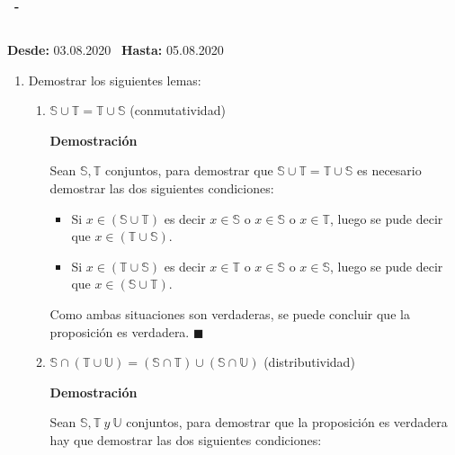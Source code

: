\documentclass[a4paper,dvipsnames]{book}
\newcommand{\np}{\null\newpage}
\newenvironment{tarea}[3]
    {
        \null\newpage
        \begin{tcolorbox}
            \textbf{\asignatura\ -\ \autor}
            \subsection{\capitalisewords{#1}}

            \begin{flushright}
            \textbf{Desde:}  #2 \
            \textbf{Hasta:}  #3 \
            \end{flushright}
        \end{tcolorbox}

    \begin{enumerate}[{Ejercicio} 1.]
    }
    {
        \end{enumerate}
        \np
    }
\begin{document}
    \begin{tarea}{Tarea Demostración de Lemas}{03.08.2020}{05.08.2020}
        \item Demostrar los siguientes lemas:

            \begin{enumerate}

                \item $\mathbb S\cup \mathbb T= \mathbb T\cup \mathbb S$
                    (conmutatividad)

                    \textbf{Demostración}

                    Sean $\mathbb S,\mathbb T$ conjuntos, para demostrar que
                    $\mathbb S\cup \mathbb T= \mathbb T\cup \mathbb S$ es
                    necesario demostrar las dos siguientes condiciones:

                    \begin{itemize}
                        \item Si $x\in(\mathbb S\cup \mathbb T)$ es decir $x\in
                            \mathbb S$ o $x\in \mathbb S$ o $x\in \mathbb T$,
                            luego se pude decir que $x\in(\mathbb T\cup \mathbb
                            S)$.

                        \item Si $x\in(\mathbb T\cup \mathbb S)$ es decir $x\in
                            \mathbb T$ o $x\in \mathbb S$ o $x\in \mathbb S$,
                            luego se pude decir que $x\in(\mathbb S\cup \mathbb
                            T)$.
                    \end{itemize}

                    Como ambas situaciones son verdaderas, se puede concluir
                    que la proposición es verdadera. $\blacksquare$


                \item $\mathbb S\cap(\mathbb T\cup \mathbb U)=(\mathbb S\cap
                    \mathbb T)\cup(\mathbb S\cap \mathbb U)$ (distributividad)

                    \textbf{Demostración}

                    Sean $\mathbb S, \mathbb T\ y\ \mathbb U$ conjuntos, para
                    demostrar que la proposición es verdadera hay que demostrar
                    las dos siguientes condiciones:


\end{enumerate}
\end{tarea}
\end{document}
